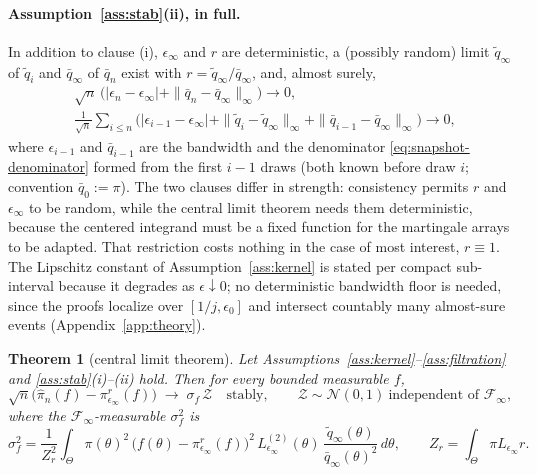 \documentclass[10pt]{article}
\theoremstyle{plain}
\newtheorem{theorem}{Theorem}
\theoremstyle{definition}
\begin{document}
\paragraph{Assumption~\ref{ass:stab}(ii), in full.} In addition to clause (i), $\epsilon_\infty$ and $r$ are deterministic, a (possibly random) limit $\tilde q_\infty$ of $\tilde q_i$ and $\bar q_\infty$ of $\bar q_n$ exist with $r=\tilde q_\infty/\bar q_\infty$, and, almost surely,
\begin{equation}
\begin{aligned}
&\sqrt n\,\bigl(|\epsilon_n-\epsilon_\infty|+\|\bar q_n-\bar q_\infty\|_\infty\bigr)\to0,\\
&\tfrac{1}{\sqrt n}\textstyle\sum_{i\le n}\bigl(|\epsilon_{i-1}-\epsilon_\infty|+\|\tilde q_i-\tilde q_\infty\|_\infty+\|\bar q_{i-1}-\bar q_\infty\|_\infty\bigr)\to0,
\end{aligned}
\label{eq:rate}
\end{equation}
where $\epsilon_{i-1}$ and $\bar q_{i-1}$ are the bandwidth and the denominator \eqref{eq:snapshot-denominator} formed from the first $i-1$ draws (both known before draw $i$; convention $\bar q_0:=\pi$). The two clauses differ in strength: consistency permits $r$ and $\epsilon_\infty$ to be random, while the central limit theorem needs them deterministic, because the centered integrand must be a fixed function for the martingale arrays to be adapted. That restriction costs nothing in the case of most interest, $r\equiv1$. The Lipschitz constant of Assumption~\ref{ass:kernel} is stated per compact sub-interval because it degrades as $\epsilon\downarrow0$; no deterministic bandwidth floor is needed, since the proofs localize over $[1/j,\epsilon_0]$ and intersect countably many almost-sure events (Appendix~\ref{app:theory}).

\begin{theorem}[central limit theorem]\label{thm:clt}
Let Assumptions~\ref{ass:kernel}--\ref{ass:filtration} and \ref{ass:stab}(i)--(ii) hold. Then for every bounded measurable $f$,
\begin{equation}
\sqrt{n}\bigl(\widehat\pi_n(f)-\pi^r_{\epsilon_\infty}(f)\bigr)\;\longrightarrow\;\sigma_f\,\mathcal{Z}
\quad\text{stably},\qquad \mathcal{Z}\sim\mathcal{N}(0,1)\ \text{independent of }\mathcal{F}_\infty,
\label{eq:clt-conv}
\end{equation}
where the $\mathcal{F}_\infty$-measurable $\sigma^2_f$ is
\begin{equation}
\sigma_f^2=\frac{1}{Z_r^{2}}\int_\Theta \pi(\theta)^2\,\bigl(f(\theta)-\pi^r_{\epsilon_\infty}(f)\bigr)^2\,L^{(2)}_{\epsilon_\infty}(\theta)\,\frac{\tilde q_\infty(\theta)}{\bar q_\infty(\theta)^2}\,d\theta,
\qquad Z_r=\int_\Theta\pi L_{\epsilon_\infty}r .
\label{eq:clt-variance}
\end{equation}
\end{theorem}
\end{document}
